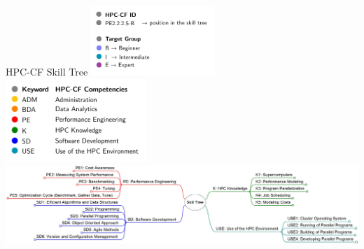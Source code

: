 \documentclass[compress,aspectratio=169]{beamer}
\begin{document}
\begin{frame}{HPC-CF Skill Tree}
\hspace{2.5cm}
\includegraphics[width=0.35\textwidth]{definition_skills.pdf}
   \includegraphics[width=0.40\textwidth]{hpccf_schwerpunkte.pdf}
\vspace{1.5cm}
    \includegraphics[width=1.00\textwidth]{skill-tree_top_levels.jpg}

\end{frame}
\end{document}
